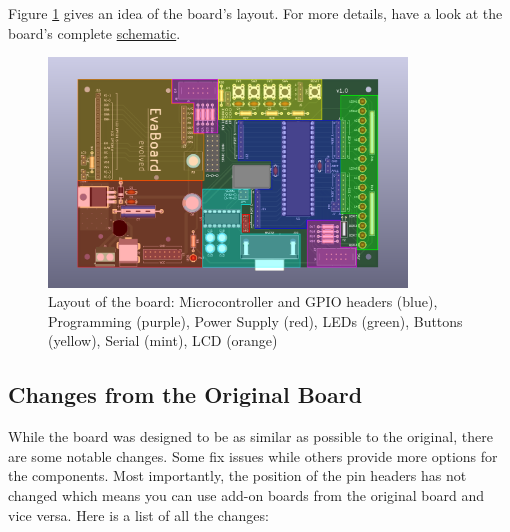\documentclass{article}
\begin{document}
Figure \ref{fig:topView} gives an idea of the board's layout. For more details, have a look at the board's complete \href{../KiCAD/Pictures/Schematic.pdf}{schematic}. 
\begin{figure}[htb]
\centering
\includegraphics[width=0.85\textwidth]{Pictures/TopView.png}
\caption{Layout of the board: Microcontroller and GPIO headers (blue), Programming (purple), Power Supply (red), LEDs (green), Buttons (yellow), Serial (mint), LCD (orange)}
\label{fig:topView}
\end{figure}

\subsection{Changes from the Original Board}\label{sec:differences}
While the board was designed to be as similar as possible to the original, there are some notable changes. Some fix issues while others provide more options for the components. Most importantly, the position of the pin headers has not changed which means you can use add-on boards from the original board and vice versa. Here is a list of all the changes:
\end{document}
